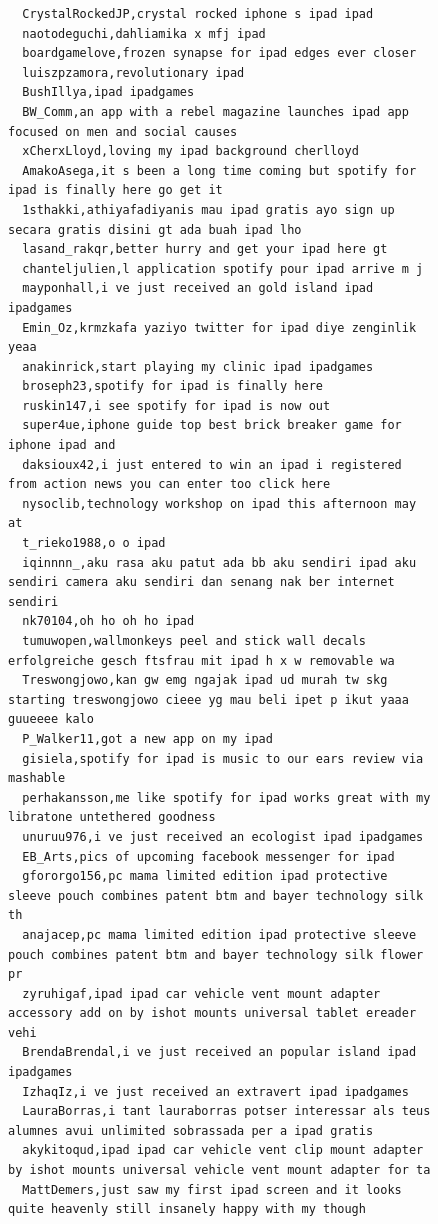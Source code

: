 \begin{figure}[htpb]
\begin{verbatim}
  CrystalRockedJP,crystal rocked iphone s ipad ipad
  naotodeguchi,dahliamika x mfj ipad
  boardgamelove,frozen synapse for ipad edges ever closer
  luiszpzamora,revolutionary ipad
  BushIllya,ipad ipadgames
  BW_Comm,an app with a rebel magazine launches ipad app focused on men and social causes
  xCherxLloyd,loving my ipad background cherlloyd
  AmakoAsega,it s been a long time coming but spotify for ipad is finally here go get it
  1sthakki,athiyafadiyanis mau ipad gratis ayo sign up secara gratis disini gt ada buah ipad lho
  lasand_rakqr,better hurry and get your ipad here gt
  chanteljulien,l application spotify pour ipad arrive m j
  mayponhall,i ve just received an gold island ipad ipadgames
  Emin_Oz,krmzkafa yaziyo twitter for ipad diye zenginlik yeaa
  anakinrick,start playing my clinic ipad ipadgames
  broseph23,spotify for ipad is finally here
  ruskin147,i see spotify for ipad is now out
  super4ue,iphone guide top best brick breaker game for iphone ipad and
  daksioux42,i just entered to win an ipad i registered from action news you can enter too click here
  nysoclib,technology workshop on ipad this afternoon may at
  t_rieko1988,o o ipad
  iqinnnn_,aku rasa aku patut ada bb aku sendiri ipad aku sendiri camera aku sendiri dan senang nak ber internet sendiri
  nk70104,oh ho oh ho ipad
  tumuwopen,wallmonkeys peel and stick wall decals erfolgreiche gesch ftsfrau mit ipad h x w removable wa
  Treswongjowo,kan gw emg ngajak ipad ud murah tw skg starting treswongjowo cieee yg mau beli ipet p ikut yaaa guueeee kalo
  P_Walker11,got a new app on my ipad
  gisiela,spotify for ipad is music to our ears review via mashable
  perhakansson,me like spotify for ipad works great with my libratone untethered goodness
  unuruu976,i ve just received an ecologist ipad ipadgames
  EB_Arts,pics of upcoming facebook messenger for ipad
  gfororgo156,pc mama limited edition ipad protective sleeve pouch combines patent btm and bayer technology silk th
  anajacep,pc mama limited edition ipad protective sleeve pouch combines patent btm and bayer technology silk flower pr
  zyruhigaf,ipad ipad car vehicle vent mount adapter accessory add on by ishot mounts universal tablet ereader vehi
  BrendaBrendal,i ve just received an popular island ipad ipadgames
  IzhaqIz,i ve just received an extravert ipad ipadgames
  LauraBorras,i tant lauraborras potser interessar als teus alumnes avui unlimited sobrassada per a ipad gratis
  akykitoqud,ipad ipad car vehicle vent clip mount adapter by ishot mounts universal vehicle vent mount adapter for ta
  MattDemers,just saw my first ipad screen and it looks quite heavenly still insanely happy with my though

\end{verbatim}
\end{figure}
